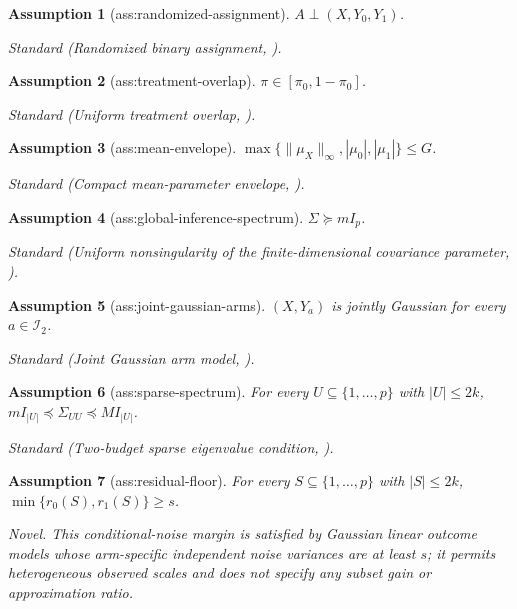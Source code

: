 \documentclass{article}
\newtheorem{assumption}{Assumption}
\begin{document}
\begin{assumption}[ass:randomized-assignment]\label{ass:randomized-assignment}
\(A\perp (X,Y_0,Y_1)\).
\par\smallskip\noindent\emph{Standard} (Randomized binary assignment, \cite{lin2025tightening}).
\end{assumption}

\begin{assumption}[ass:treatment-overlap]\label{ass:treatment-overlap}
\(\pi\in[\pi_0,1-\pi_0]\).
\par\smallskip\noindent\emph{Standard} (Uniform treatment overlap, \cite{ji2023modelagnostic}).
\end{assumption}

\begin{assumption}[ass:mean-envelope]\label{ass:mean-envelope}
\(\max\{\|\mu_X\|_\infty,|\mu_0|,|\mu_1|\}\le G\).
\par\smallskip\noindent\emph{Standard} (Compact mean-parameter envelope, \cite{vandervaart1998asymptotic}).
\end{assumption}

\begin{assumption}[ass:global-inference-spectrum]\label{ass:global-inference-spectrum}
\(\Sigma\succeq mI_p\).
\par\smallskip\noindent\emph{Standard} (Uniform nonsingularity of the finite-dimensional covariance parameter, \cite{vandervaart1998asymptotic}).
\end{assumption}

\begin{assumption}[ass:joint-gaussian-arms]\label{ass:joint-gaussian-arms}
\((X,Y_a)\) is jointly Gaussian for every \(a\in\mathcal I_2\).
\par\smallskip\noindent\emph{Standard} (Joint Gaussian arm model, \cite{lin2025tightening}).
\end{assumption}

\begin{assumption}[ass:sparse-spectrum]\label{ass:sparse-spectrum}
For every \(U\subseteq\{1,\ldots,p\}\) with \(|U|\le2k\), \(mI_{|U|}\preceq\Sigma_{UU}\preceq MI_{|U|}\).
\par\smallskip\noindent\emph{Standard} (Two-budget sparse eigenvalue condition, \cite{das2011submodular}).
\end{assumption}

\begin{assumption}[ass:residual-floor]\label{ass:residual-floor}
For every \(S\subseteq\{1,\ldots,p\}\) with \(|S|\le2k\), \(\min\{r_0(S),r_1(S)\}\ge s\).
\par\smallskip\noindent\emph{Novel.} This conditional-noise margin is satisfied by Gaussian linear outcome models whose arm-specific independent noise variances are at least \(s\); it permits heterogeneous observed scales and does not specify any subset gain or approximation ratio.
\end{assumption}
\end{document}
